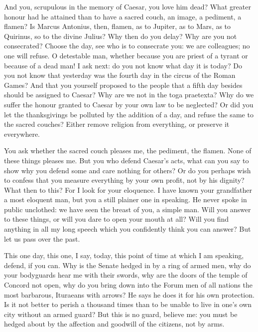  And you, scrupulous in the memory of Caesar, you love him dead? What greater honour had he attained than to have a sacred couch, an image, a pediment, a flamen? Is Marcus Antonius, then, flamen, as to Jupiter, as to Mars, as to Quirinus, so to the divine Julius? Why then do you delay? Why are you not consecrated? Choose the day, see who is to consecrate you: we are colleagues; no one will refuse. O detestable man, whether because you are priest of a tyrant or because of a dead man! I ask next: do you not know what day it is today? Do you not know that yesterday was the fourth day in the circus of the Roman Games? And that you yourself proposed to the people that a fifth day besides should be assigned to Caesar? Why are we not in the toga praetexta? Why do we suffer the honour granted to Caesar by your own law to be neglected? Or did you let the thanksgivings be polluted by the addition of a day, and refuse the same to the sacred couches? Either remove religion from everything, or preserve it everywhere.

 You ask whether the sacred couch pleases me, the pediment, the flamen. None of these things pleases me. But you who defend Caesar's acts, what can you say to show why you defend some and care nothing for others? Or do you perhaps wish to confess that you measure everything by your own profit, not by his dignity? What then to this? For I look for your eloquence. I have known your grandfather a most eloquent man, but you a still plainer one in speaking. He never spoke in public unclothed: we have seen the breast of you, a simple man. Will you answer to these things, or will you dare to open your mouth at all? Will you find anything in all my long speech which you confidently think you can answer? But let us pass over the past.

 This one day, this one, I say, today, this point of time at which I am speaking, defend, if you can. Why is the Senate hedged in by a ring of armed men, why do your bodyguards hear me with their swords, why are the doors of the temple of Concord not open, why do you bring down into the Forum men of all nations the most barbarous, Ituraeans with arrows? He says he does it for his own protection. Is it not better to perish a thousand times than to be unable to live in one's own city without an armed guard? But this is no guard, believe me: you must be hedged about by the affection and goodwill of the citizens, not by arms.

